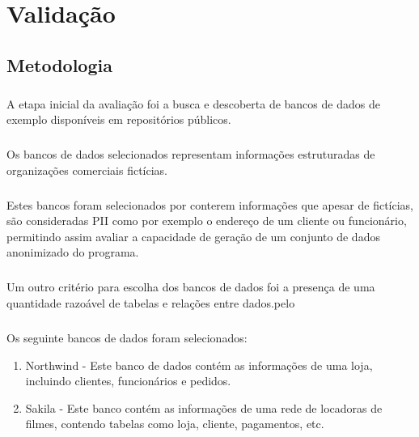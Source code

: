\chapter{Validação}
\label{cap5}

\section{Metodologia}

\paragraph{} A etapa inicial da avaliação foi a busca e descoberta de bancos de dados de exemplo disponíveis em repositórios públicos.

\paragraph{} Os bancos de dados selecionados representam informações estruturadas de organizações comerciais fictícias.

\paragraph{} Estes bancos foram selecionados por conterem informações que apesar de fictícias, são consideradas PII como por exemplo o endereço de um cliente ou funcionário, permitindo assim avaliar a capacidade de geração de um conjunto de dados anonimizado do programa.

\paragraph{} Um outro critério para escolha dos bancos de dados foi a presença de uma quantidade razoável de tabelas e relações entre dados.pelo

\paragraph{} Os seguinte bancos de dados foram selecionados:

\begin{enumerate}
    \item Northwind\cite{northwindpg} - Este banco de dados contém as informações de uma loja, incluindo clientes, funcionários e pedidos.
    \item Sakila\cite{sakila} - Este banco contém as informações de uma rede de locadoras de filmes, contendo tabelas como loja, cliente, pagamentos, etc.
\end{enumerate}

